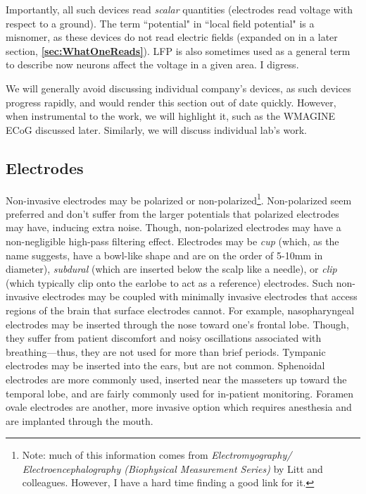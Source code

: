 Importantly, all such devices read \textit{scalar} quantities (electrodes read voltage with respect to a ground). The term ``potential" in ``local field potential" is a misnomer, as these devices do not read electric fields (expanded on in a later section, \textbf{\ref{sec:WhatOneReads}}). LFP is also sometimes used as a general term to describe now neurons affect the voltage in a given area. I digress.\newline

We will generally avoid discussing individual company's devices, as such devices progress rapidly, and would render this section out of date quickly. However, when instrumental to the work, we will highlight it, such as the WMAGINE ECoG discussed later. Similarly, we will discuss individual lab's work. 


\subsection{Electrodes}

Non-invasive electrodes may be polarized or non-polarized\footnote{Note: much of this information comes from \textit{Electromyography/ Electroencephalography (Biophysical Measurement Series)} by Litt and colleagues. However, I have a hard time finding a good link for it.}. Non-polarized seem preferred and don't suffer from the larger potentials that polarized electrodes may have, inducing extra noise. Though, non-polarized electrodes may have a non-negligible high-pass filtering effect. Electrodes may be \textit{cup} (which, as the name suggests, have a bowl-like shape and are on the order of 5-10mm in diameter), \textit{subdural} (which are inserted below the scalp like a needle), or \textit{clip} (which typically clip onto the earlobe to act as a reference) electrodes. Such non-invasive electrodes may be coupled with minimally invasive electrodes that access regions of the brain that surface electrodes cannot. For example, nasopharyngeal electrodes may be inserted through the nose toward one's frontal lobe. Though, they suffer from patient discomfort and noisy oscillations associated with breathing---thus, they are not used for more than brief periods. Tympanic electrodes may be inserted into the ears, but are not common. Sphenoidal electrodes are more commonly used, inserted near the masseters up toward the temporal lobe, and are fairly commonly used for in-patient monitoring. Foramen ovale electrodes are another, more invasive option which requires anesthesia and are implanted through the mouth. \newline

